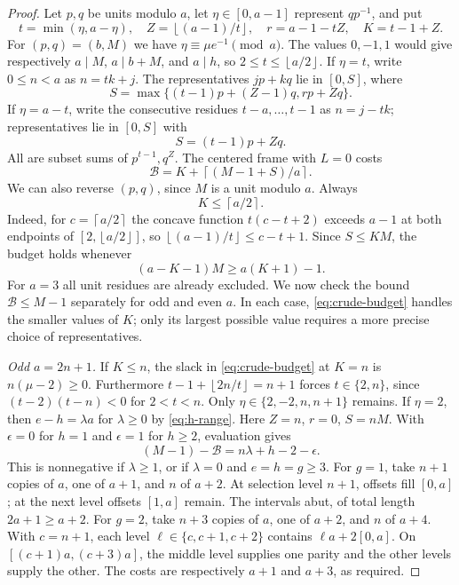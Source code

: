 \documentclass[11pt,a4paper,reqno]{amsart}
\theoremstyle{definition}
\theoremstyle{remark}
\newcommand{\ceil}[1]{\left\lceil #1\right\rceil}
\newcommand{\floor}[1]{\left\lfloor #1\right\rfloor}
\begin{document}
\begin{proof}
Let $p,q$ be units modulo $a$, let $\eta\in[0,a-1]$ represent $qp^{-1}$,
and put
\begin{equation}\label{eq:path-data}
 t=\min(\eta,a-\eta),\quad Z=\floor{(a-1)/t},\quad
 r=a-1-tZ,\quad K=t-1+Z.
\end{equation}
For $(p,q)=(b,M)$ we have $\eta\equiv\mu e^{-1}\pmod a$.
The values $0,-1,1$ would give respectively $a\mid M$, $a\mid b+M$,
and $a\mid h$, so $2\le t\le\floor{a/2}$.
If $\eta=t$, write $0\le n<a$ as $n=tk+j$. The representatives $jp+kq$
lie in $[0,S]$, where
\begin{equation}\label{eq:path-positive}
 S=\max\{(t-1)p+(Z-1)q,rp+Zq\}.
\end{equation}
If $\eta=a-t$, write the consecutive residues $t-a,\ldots,t-1$ as
$n=j-tk$; representatives lie in $[0,S]$ with
\begin{equation}\label{eq:path-negative}
 S=(t-1)p+Zq.
\end{equation}
All are subset sums of $p^{t-1},q^Z$. The centered frame with $L=0$ costs
\begin{equation}\label{eq:path-cost}
 \mathcal B=K+\ceil{(M-1+S)/a}.
\end{equation}
We can also reverse $(p,q)$, since $M$ is a unit modulo $a$.
Always
\begin{equation}\label{eq:K-bound}
 K\le\ceil{a/2}.
\end{equation}
Indeed, for $c=\ceil{a/2}$ the concave function $t(c-t+2)$ exceeds $a-1$
at both endpoints of $[2,\floor{a/2}]$, so
$\floor{(a-1)/t}\le c-t+1$. Since $S\le KM$, the budget holds whenever
\begin{equation}\label{eq:crude-budget}
 (a-K-1)M\ge a(K+1)-1.
\end{equation}
For $a=3$ all unit residues are already excluded. We now check the bound
$\mathcal B\le M-1$ separately for odd and even $a$. In each case,
\eqref{eq:crude-budget} handles the smaller values of $K$; only its largest
possible value requires a more precise choice of representatives.

\smallskip\noindent\emph{Odd $a=2n+1$.}
If $K\le n$, the slack in \eqref{eq:crude-budget} at $K=n$ is
$n(\mu-2)\ge0$. Furthermore
$t-1+\floor{2n/t}=n+1$ forces $t\in\{2,n\}$, since
$(t-2)(t-n)<0$ for $2<t<n$. Only $\eta\in\{2,-2,n,n+1\}$ remains.
If $\eta=2$, then $e-h=\lambda a$ for $\lambda\ge0$ by \eqref{eq:h-range}.
Here $Z=n$, $r=0$, $S=nM$. With $\epsilon=0$ for $h=1$ and $\epsilon=1$
for $h\ge2$, evaluation gives
\begin{equation}\label{eq:eta-two}
 (M-1)-\mathcal B=n\lambda+h-2-\epsilon.
\end{equation}
This is nonnegative if $\lambda\ge1$, or if $\lambda=0$ and $e=h=g\ge3$.
For $g=1$, take $n+1$ copies of $a$, one of $a+1$, and $n$ of $a+2$.
At selection level $n+1$, offsets fill $[0,a]$; at the next level offsets
$[1,a]$ remain. The intervals abut, of total length $2a+1\ge a+2$.
For $g=2$, take $n+3$ copies of $a$, one of $a+2$, and $n$ of $a+4$.
With $c=n+1$, each level $\ell\in\{c,c+1,c+2\}$ contains
$\ell a+2[0,a]$. On $[(c+1)a,(c+3)a]$, the middle level supplies one
parity and the other levels supply the other. The costs are respectively
$a+1$ and $a+3$, as required.


\end{proof}
\end{document}
